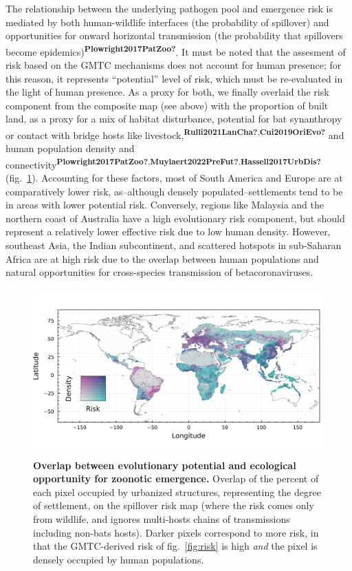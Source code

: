 \documentclass[10pt,oneside]{article}
\makeatletter
\def\maxwidth{\ifdim\Gin@nat@width>\linewidth\linewidth
\else\Gin@nat@width\fi}
\let\Oldincludegraphics\includegraphics
\renewcommand{\includegraphics}[1]{\Oldincludegraphics[width=\maxwidth]{#1}}
\makeatother
\begin{document}
The relationship between the underlying pathogen pool and emergence risk
is mediated by both human-wildlife interfaces (the probability of
spillover) and opportunities for onward horizontal transmission (the
probability that spillovers become
epidemics)\textsuperscript{\textbf{Plowright2017PatZoo?}}. It must be
noted that the assesment of risk based on the GMTC mechanisms does not
account for human presence; for this reason, it represents ``potential''
level of risk, which must be re-evaluated in the light of human
presence. As a proxy for both, we finally overlaid the risk component
from the composite map (see above) with the proportion of built land, as
a proxy for a mix of habitat disturbance, potential for bat synanthropy
or contact with bridge hosts like
livestock,\textsuperscript{\textbf{Rulli2021LanCha?},\textbf{Cui2019OriEvo?}}
and human population density and
connectivity\textsuperscript{\textbf{Plowright2017PatZoo?},\textbf{Muylaert2022PreFut?},\textbf{Hassell2017UrbDis?}}
(fig.~\ref{fig:compound}). Accounting for these factors, most of South
America and Europe are at comparatively lower risk, as--although densely
populated--settlements tend to be in areas with lower potential risk.
Conversely, regions like Malaysia and the northern coast of Australia
have a high evolutionary risk component, but should represent a
relatively lower effective risk due to low human density. However,
southeast Asia, the Indian subcontinent, and scattered hotspots in
sub-Saharan Africa are at high risk due to the overlap between human
populations and natural opportunities for cross-species transmission of
betacoronaviruses.

\begin{figure}
\hypertarget{fig:compound}{%
\centering
\includegraphics{figures/risk_compounded.png}
\caption{\textbf{Overlap between evolutionary potential and ecological
opportunity for zoonotic emergence.} Overlap of the percent of each
pixel occupied by urbanized structures, representing the degree of
settlement, on the spillover risk map (where the risk comes only from
wildlife, and ignores multi-hosts chains of transmissions including
non-bats hosts). Darker pixels correspond to more risk, in that the
GMTC-derived risk of fig.~\ref{fig:risk} is high \emph{and} the pixel is
densely occupied by human populations.}\label{fig:compound}
}
\end{figure}
\end{document}
